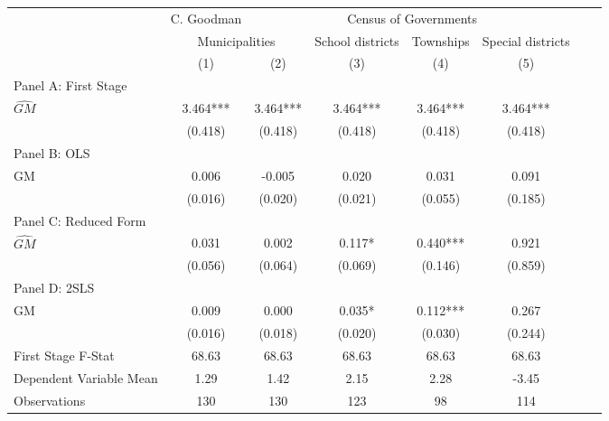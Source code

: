  \begin{tabular}{l*{7}{c}} \toprule
&\multicolumn{1}{c}{C. Goodman}&\multicolumn{4}{c}{Census of Governments}\\\cmidrule(lr){2-2}\cmidrule(lr){3-6}
&\multicolumn{2}{c}{Municipalities}&\multicolumn{1}{c}{School districts}&\multicolumn{1}{c}{Townships}&\multicolumn{1}{c}{Special districts}\\\cmidrule(lr){2-3}\cmidrule(lr){4-6}
&\multicolumn{1}{c}{(1)}&\multicolumn{1}{c}{(2)}&\multicolumn{1}{c}{(3)}&\multicolumn{1}{c}{(4)}&\multicolumn{1}{c}{(5)}\\
\cmidrule(lr){1-6}
\multicolumn{5}{l}{Panel A: First Stage}\\
\cmidrule(lr){1-6}
$\widehat{GM}$  &    3.464***&    3.464***&    3.464***&    3.464***&    3.464***\\
                &  (0.418)   &  (0.418)   &  (0.418)   &  (0.418)   &  (0.418)   \\
\cmidrule(lr){1-6}
\multicolumn{5}{l}{Panel B: OLS}\\
\cmidrule(lr){1-6}
GM              &    0.006   &   -0.005   &    0.020   &    0.031   &    0.091   \\
                &  (0.016)   &  (0.020)   &  (0.021)   &  (0.055)   &  (0.185)   \\
\cmidrule(lr){1-6}
\multicolumn{5}{l}{Panel C: Reduced Form}\\
\cmidrule(lr){1-6}
$\widehat{GM}$  &    0.031   &    0.002   &    0.117*  &    0.440***&    0.921   \\
                &  (0.056)   &  (0.064)   &  (0.069)   &  (0.146)   &  (0.859)   \\
\cmidrule(lr){1-6}
\multicolumn{5}{l}{Panel D: 2SLS}\\
\cmidrule(lr){1-6}
GM              &    0.009   &    0.000   &    0.035*  &    0.112***&    0.267   \\
                &  (0.016)   &  (0.018)   &  (0.020)   &  (0.030)   &  (0.244)   \\
\midrule
First Stage F-Stat&    68.63   &    68.63   &    68.63   &    68.63   &    68.63   \\
Dependent Variable Mean&     1.29   &     1.42   &     2.15   &     2.28   &    -3.45   \\
Observations    &      130   &      130   &      123   &       98   &      114   \\
       \bottomrule \end{tabular}
